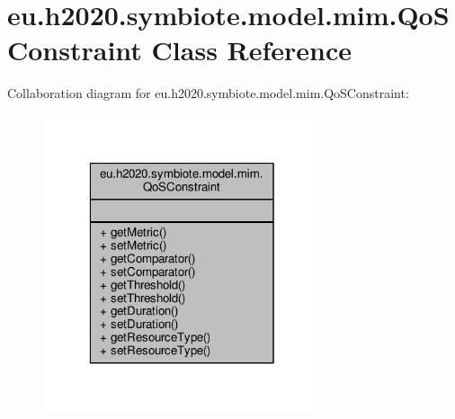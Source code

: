 \hypertarget{classeu_1_1h2020_1_1symbiote_1_1model_1_1mim_1_1QoSConstraint}{}\section{eu.\+h2020.\+symbiote.\+model.\+mim.\+Qo\+S\+Constraint Class Reference}
\label{classeu_1_1h2020_1_1symbiote_1_1model_1_1mim_1_1QoSConstraint}


Collaboration diagram for eu.\+h2020.\+symbiote.\+model.\+mim.\+Qo\+S\+Constraint\+:\nopagebreak
\begin{figure}[H]
\begin{center}
\leavevmode
\includegraphics[width=232pt]{classeu_1_1h2020_1_1symbiote_1_1model_1_1mim_1_1QoSConstraint__coll__graph}
\end{center}
\end{figure}
